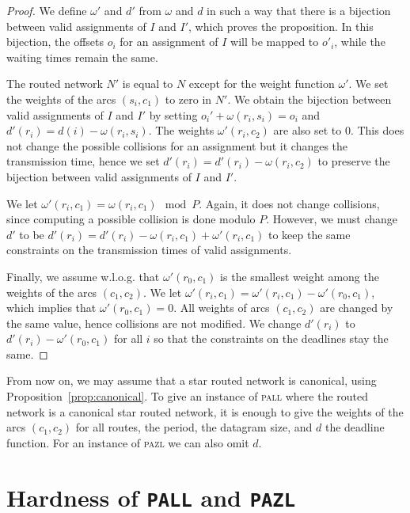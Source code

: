 \documentclass[a4paper,10pt]{journal}
\newcommand\pazl{\textsc{pazl}\xspace}
\newcommand\pall{\textsc{pall}\xspace}
\begin{document}
  \begin{proof}
  We define $\omega'$ and $d'$ from $\omega$ and $d$ in such a way that there is a bijection 
  between valid assignments of $I$ and $I'$, which proves the proposition. In this bijection,
  the offsets $o_i$ for an assignment of $I$ will be mapped to $o'_i$, while the waiting times remain the same.
  
  The routed network $N'$ is equal to $N$ except for the weight function $\omega'$.
  We set the weights of the arcs $(s_i,c_1)$ to zero in $N'$. We obtain the bijection between valid assignments of $I$ and $I'$ by setting $o_i' + \omega(r_i,s_i) = o_i $ and $d'(r_i) = d(i) - \omega(r_i,s_i)$. The weights $\omega'(r_i,c_2)$ are also set to $0$. This does not change the possible collisions
  for an assignment but it changes the transmission time, hence we set $d'(r_i) = d'(r_i) - \omega(r_i,c_2)$
  to preserve the bijection between valid assignments of $I$ and $I'$. 

  We let $\omega'(r_i,c_1) = \omega(r_i,c_1) \mod P$. Again, it does not change collisions, since computing a possible collision is done modulo $P$. However, we must change $d'$ to be $d'(r_i) = d'(r_i) - \omega(r_i,c_1) + \omega'(r_i,c_1)$ to keep the same constraints on the transmission times of valid assignments.

  Finally, we assume w.l.o.g. that $\omega'(r_0,c_1)$ is the smallest weight among the weights of the arcs
  $(c_1,c_2)$. We let $\omega'(r_i,c_1) = \omega'(r_i,c_1) - \omega'(r_0,c_1)$, which implies that $\omega'(r_0,c_1) = 0$.  All weights of arcs $(c_1,c_2)$ are changed by the same value, hence collisions are not modified. We change $d'(r_i)$ to  $d'(r_i) - \omega'(r_0,c_1)$ for all $i$ so that the constraints on the deadlines stay the same.
  \end{proof}

   From now on, we may assume that a star routed network is canonical, using Proposition~\ref{prop:canonical}. To give an instance of \pall where the routed network is a canonical star routed network, it is enough to give the weights of the arcs $(c_1,c_2)$ for all routes, the period, the datagram size, and $d$ the deadline function. For an instance of \pazl we can also omit $d$.


\section{Hardness of \texttt{PALL} and \texttt{PAZL}}
  \label{sec:complexity}
\end{document}
